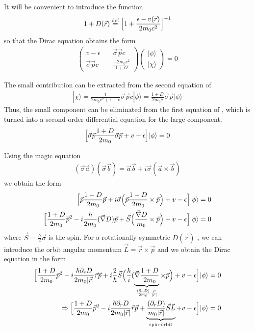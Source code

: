 \documentclass[11pt,a4paper]{report}
\begin{document}
It will be convenient to introduce the function
\begin{eqnarray}
1+D(\vec{r})\stackrel{\text{def}}{=}\Bigl[1+\frac{\epsilon-v(\vec{r})}{2m_0c^2}\Bigr]^{-1}
\end{eqnarray}
so that the Dirac equation obtains the form
\begin{eqnarray}
\left(\begin{array}{cc}
v-\epsilon &\quad \vec{\sigma}\vec{p}c\\
\vec{\sigma}\vec{p}c &\quad \frac{-2m_0c^2}{1+D}\end{array}\right)
\left(\begin{array}{c}|\phi\rangle\\|\chi\rangle\end{array}\right)=0
\label{eq:dirac2by2withepsilonb}
\end{eqnarray}

The small contribution can be extracted from the second equation of
\begin{eqnarray}
|\chi\rangle
=\frac{1}{2m_0c^2+\epsilon-v}
\vec{\sigma}\vec{p}c |\phi\rangle
=\frac{1+D}{2m_0c}
\vec{\sigma}\vec{p} |\phi\rangle
\end{eqnarray}
Thus, the small component can be eliminated from the first equation of
, which is turned into a second-order
differential equation for the large component.
\begin{eqnarray}
\Bigl[\vec{\sigma}\vec{p} \frac{1+D}{2m_0}
\vec{\sigma}\vec{p} +v-\epsilon\Bigr]|\phi\rangle=0
\end{eqnarray}

Using the magic equation
\begin{eqnarray}
(\vec{\sigma}\vec{a})(\vec{\sigma}\vec{b})
=\vec{a}\vec{b}+i\vec{\sigma}(\vec{a}\times\vec{b})
\end{eqnarray}
we obtain the form
\begin{eqnarray}
\Bigl[\vec{p} \frac{1+D}{2m_0}\vec{p} 
+i\vec{\sigma} 
\Bigl(\vec{p} \frac{1+D}{2m_0}\times\vec{p} \Bigr)
+v-\epsilon\Bigr]|\phi\rangle=0
\nonumber\\
\Bigl[\frac{1+D}{2m_0}\vec{p}^2-i\frac{\hbar}{2m_0}(\vec{\nabla}D)\vec{p}
+\vec{S}\Bigl(\frac{\vec{\nabla}D}{m_0}\times\vec{p} \Bigr)
+v-\epsilon\Bigr]|\phi\rangle=0
\end{eqnarray}
where $\vec{S}=\frac{\hbar}{2}\vec{\sigma}$ is the spin.  For a
rotationally symmetric $D(\vec{r})$ , we can
introduce the orbit angular momentum $\vec{L}=\vec{r}\times\vec{p}$
and we obtain the Dirac equation in the form
\begin{eqnarray}
\Bigl[
\frac{1+D}{2m_0}\vec{p}^2 
-i\frac{\hbar\partial_rD}{2m_0|\vec{r}|}\vec{r}\vec{p} 
+i\frac{2}{\hbar}\vec{S} 
\Bigl(\frac{\hbar}{i}(\underbrace{\vec{\nabla}\frac{1+D}{2m_0}}
_{\frac{(\partial_r D)}{2m_0}\frac{\vec{r}}{|\vec{r}|}}\times\vec{p} \Bigr)
+v-\epsilon\Bigr]|\phi\rangle=0
\nonumber\\
\Rightarrow\Bigl[
\frac{1+D}{2m_0}\vec{p}^2 
-i\frac{\hbar\partial_rD}{2m_0|\vec{r}|}\vec{r}\vec{p} 
+ \underbrace{\frac{(\partial_r D)}{m_0|\vec{r}|}\vec{S}\vec{L}}_{\text{spin-orbit}}
+v-\epsilon\Bigr]|\phi\rangle=0
\nonumber\\
\end{eqnarray}
\end{document}
